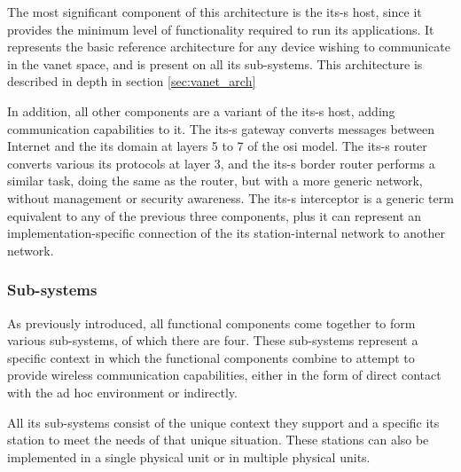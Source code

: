 The most significant component of this architecture is the \gls{its-s} host, since it provides the minimum level of functionality required to run \gls{its} applications. It represents the basic reference architecture for any device wishing to communicate in the \gls{vanet} space, and is present on all \gls{its} sub-systems. This architecture is described in depth in section \ref{sec:vanet_arch} 

In addition, all other components are a variant of the \gls{its-s} host, adding communication capabilities to it. The \gls{its-s} gateway converts messages between Internet and the \gls{its} domain at layers 5 to 7 of the \gls{osi} model. The \gls{its-s} router converts various \gls{its} protocols at layer 3, and the \gls{its-s} border router performs a similar task, doing the same as the router, but with a more generic network, without management or security awareness. The \gls{its-s} interceptor is a generic term equivalent to any of the previous three components, plus it can represent an implementation-specific connection of the \gls{its} station-internal network to another network.

\subsubsection{Sub-systems}

As previously introduced, all functional components come together to form various sub-systems, of which there are four. These sub-systems represent a specific context in which the functional components combine to attempt to provide wireless communication capabilities, either in the form of direct contact with the ad hoc environment or indirectly.

All \gls{its} sub-systems consist of the unique context they support and a specific \gls{its} station to meet the needs of that unique situation. These stations can also be implemented in a single physical unit or in multiple physical units.


